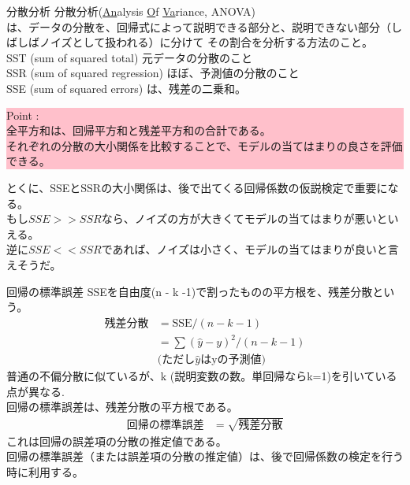 \documentclass[dvipdfmx,autodetect-engine, unicode, 10pt, aspectratio=169]{beamer}
\begin{document}
\begin{frame}[fragile]{分散分析}
    分散分析(\underline{An}alysis \underline{O}f \underline{Va}riance, ANOVA) \\
    は、データの分散を、回帰式によって説明できる部分と、説明できない部分（しばしばノイズとして扱われる）に分けて
    その割合を分析する方法のこと。 \\
    SST (sum of squared total) 元データの分散のこと \\
    SSR (sum of squared regression) ほぼ、予測値の分散のこと \\
    SSE (sum of squared errors) は、残差の二乗和。　\\

    \begin{center}
       \colorbox{pink}{
             \begin{minipage}[t]{0.9\textwidth}
             {\small 
                Point : \\
                全平方和は、回帰平方和と残差平方和の合計である。\\
                それぞれの分散の大小関係を比較することで、モデルの当てはまりの良さを評価できる。
                }
             \end{minipage}
          }
    \end{center}
    とくに、SSEとSSRの大小関係は、後で出てくる回帰係数の仮説検定で重要になる。 \\
    もし$SSE>>SSR$なら、ノイズの方が大きくてモデルの当てはまりが悪いといえる。\\
    逆に$SSE<<SSR$であれば、ノイズは小さく、モデルの当てはまりが良いと言えそうだ。

\end{frame}

\begin{frame}{回帰の標準誤差}
    SSEを自由度(n - k -1)で割ったものの平方根を、残差分散という。 \\
    \begin{align*}
        \text{残差分散} &= \text{SSE} / (n-k-1) \\
        &= \sum(\hat{y} - y)^2 / (n-k-1)  \\
        &\text{(ただし$\hat{y}$はyの予測値)}
    \end{align*}
    普通の不偏分散に似ているが、k (説明変数の数。単回帰ならk=1)を引いている点が異なる.\\
    回帰の標準誤差は、残差分散の平方根である。
    \begin{align*}
        \text{回帰の標準誤差} &= \sqrt{\text{残差分散}}
    \end{align*}
    これは回帰の誤差項の分散の推定値である。 \\
    回帰の標準誤差（または誤差項の分散の推定値）は、後で回帰係数の検定を行う時に利用する。
\end{frame}
\end{document}
